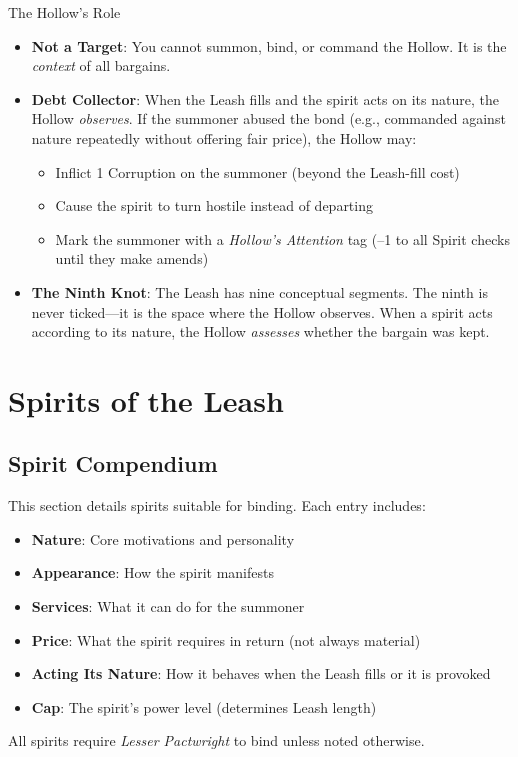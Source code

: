 \documentclass[11pt,twoside]{book}
\begin{document}
\begin{mechbox}{The Hollow's Role}
  \begin{itemize}
    \item \textbf{Not a Target}: You cannot summon, bind, or command the Hollow. It is the \textit{context} of all bargains.
    \item \textbf{Debt Collector}: When the Leash fills and the spirit acts on its nature, the Hollow \textit{observes}. If the summoner abused the bond (e.g., commanded against nature repeatedly without offering fair price), the Hollow may:
      \begin{itemize}
        \item Inflict 1 Corruption on the summoner (beyond the Leash-fill cost)
        \item Cause the spirit to turn hostile instead of departing
        \item Mark the summoner with a \textit{Hollow's Attention} tag (--1 to all Spirit checks until they make amends)
      \end{itemize}
    \item \textbf{The Ninth Knot}: The Leash has nine conceptual segments. The ninth is never ticked---it is the space where the Hollow observes. When a spirit acts according to its nature, the Hollow \textit{assesses} whether the bargain was kept.
  \end{itemize}
\end{mechbox}


\part{Spirits of the Leash}

\chapter{Spirit Compendium}
This section details spirits suitable for binding. Each entry includes:
\begin{itemize}
  \item \textbf{Nature}: Core motivations and personality
  \item \textbf{Appearance}: How the spirit manifests
  \item \textbf{Services}: What it can do for the summoner
  \item \textbf{Price}: What the spirit requires in return (not always material)
  \item \textbf{Acting Its Nature}: How it behaves when the Leash fills or it is provoked
  \item \textbf{Cap}: The spirit's power level (determines Leash length)
\end{itemize}
All spirits require \textit{Lesser Pactwright} to bind unless noted otherwise.
\end{document}
